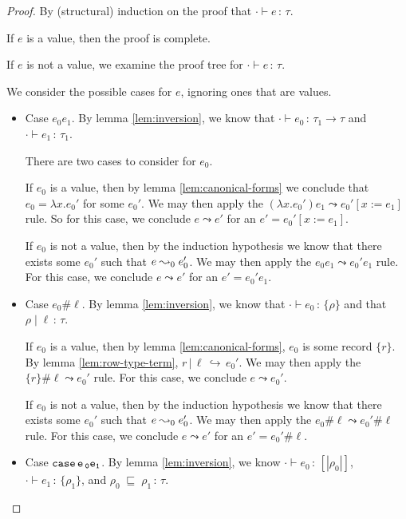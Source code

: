 \documentclass{article}
\newcommand{\variant}[1]{[\!|#1|\!]}
\newcommand{\case}[2]{\tt{case}\,#1\,#2}
\newcommand{\hastp}[3]{#1 \vdash #2 \,:\, #3}
\newcommand{\haslbl}[3]{#1\;|\;#2\,:\, #3}
\newcommand{\caseVarRcd}[3]{#1 \;\sqsubseteq\; #2 \,:\, #3}
\newcommand{\haslbltm}[3]{#1\,|\,#2\,\hookrightarrow\, #3}
\newcommand{\step}[2]{#1 \leadsto #2}
\begin{document}
\begin{proof}
By (structural) induction on the proof that $\hastp{\cdot}{e}{\tau}$.

If \(e\) is a value, then the proof is complete.

If \(e\) is not a value, we examine the proof tree for \(\hastp \cdot e \tau\).

We consider the possible cases for \(e\), ignoring ones that are values.

\begin{itemize}
\item Case \(e_0 e_1\).
    By lemma \ref{lem:inversion}, we know that \(\hastp \cdot {e_0} {\tau_1 \to
    \tau}\) and \(\hastp \cdot {e_1} \tau_1\).

    There are two cases to consider for \(e_0\).

    If \(e_0\) is a value, then by lemma \ref{lem:canonical-forms} we conclude
    that \(e_0 = \lambda x. e_0'\) for some \(e_0'\). We may then apply the
    \(\step {(\lambda x.e_0') e_1} {e_0'[x:=e_1]}\) rule. So for this case, we
    conclude \(\step e {e'}\) for an \(e' = e_0'[x:=e_1]\).

    If \(e_0\) is not a value, then by the induction hypothesis we know that
    there exists some \(e_0'\) such that \(\step e_0 {e_0'}\). We may then apply
    the \(\step {e_0 e_1}{e_0' e_1}\) rule. For this case, we conclude \(\step e
    {e'}\) for an \(e' = e_0' e_1\).

  \item Case \(e_0 \# \ell\). By lemma \ref{lem:inversion}, we know that
    \(\hastp \cdot {e_0} {\{\rho\}}\) and that \(\haslbl \rho \ell \tau\).

    If \(e_0\) is a value, then by lemma \ref{lem:canonical-forms}, \(e_0\) is
    some record \(\{r\}\). By lemma \ref{lem:row-type-term}, \(\haslbltm r \ell
    {e_0'}\). We may then apply the \(\step {\{r\} \# \ell} {e_0'}\) rule. For this
    case, we conclude \(\step e {e_0'}\).

    If \(e_0\) is not a value, then by the induction hypothesis we know that
    there exists some \(e_0'\) such that \(\step e_0 {e_0'}\). We may then apply
    the \(\step {e_0 \# \ell}{e_0' \# \ell}\) rule. For this case, we conclude
    \(\step e {e'}\) for an \(e' = e_0' \# \ell\).

  \item Case \(\case e_0 e_1\). By lemma \ref{lem:inversion}, we know \(\hastp
    \cdot {e_0} {\variant {\rho_0}}\), \(\hastp \cdot {e_1} {\{\rho_1\}}\),
    and \(\caseVarRcd {\rho_0} {\rho_1} \tau\).


\end{itemize}
\end{proof}
\end{document}
